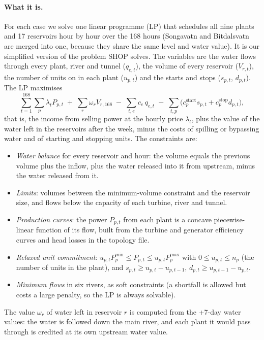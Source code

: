\paragraph{What it is.} For each case we solve one linear programme (LP) that schedules all nine plants and 17 reservoirs hour by hour over the 168 hours (Songavatn and Bitdalsvatn are merged into one, because they share the same level and water value). It is our simplified version of the problem SHOP solves. The variables are the water flows through every plant, river and tunnel ($q_{e,t}$), the volume of every reservoir ($V_{r,t}$), the number of units on in each plant ($u_{p,t}$) and the starts and stops ($s_{p,t}$, $d_{p,t}$). The LP maximises
\begin{equation}
  \sum_{t=1}^{168} \sum_{p} \lambda_t P_{p,t}
  \;+\; \sum_{r} \omega_r V_{r,168}
  \;-\; \sum_{t,e} c_e\, q_{e,t}
  \;-\; \sum_{t,p} \bigl(c^{\text{start}}_p s_{p,t} + c^{\text{stop}}_p d_{p,t}\bigr),
\end{equation}
that is, the income from selling power at the hourly price $\lambda_t$, plus the value of the water left in the reservoirs after the week, minus the costs of spilling or bypassing water and of starting and stopping units. The constraints are:
\begin{itemize}
  \item \emph{Water balance} for every reservoir and hour: the volume equals the previous volume plus the inflow, plus the water released into it from upstream, minus the water released from it.
  \item \emph{Limits}: volumes between the minimum-volume constraint and the reservoir size, and flows below the capacity of each turbine, river and tunnel.
  \item \emph{Production curves}: the power $P_{p,t}$ from each plant is a concave piecewise-linear function of its flow, built from the turbine and generator efficiency curves and head losses in the topology file.
  \item \emph{Relaxed unit commitment}: $u_{p,t} P^{\min}_p \le P_{p,t} \le u_{p,t} P^{\max}_p$ with $0 \le u_{p,t} \le n_p$ (the number of units in the plant), and $s_{p,t} \ge u_{p,t} - u_{p,t-1}$, $d_{p,t} \ge u_{p,t-1} - u_{p,t}$.
  \item \emph{Minimum flows} in six rivers, as soft constraints (a shortfall is allowed but costs a large penalty, so the LP is always solvable).
\end{itemize}
The value $\omega_r$ of water left in reservoir $r$ is computed from the +7-day water values: the water is followed down the main river, and each plant it would pass through is credited at its own upstream water value.

